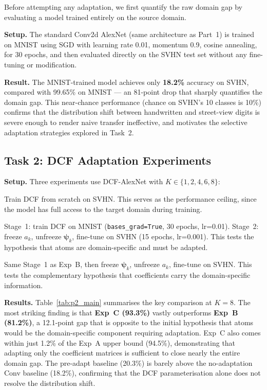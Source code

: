\documentclass[11pt,letterpaper]{article}
\newcommand{\psivec}{\boldsymbol{\psi}}
\begin{document}
Before attempting any adaptation, we first quantify the raw domain gap by
evaluating a model trained entirely on the source domain.

\textbf{Setup.}
The standard Conv2d AlexNet (same architecture as Part~1) is trained on
MNIST using SGD with learning rate 0.01, momentum 0.9, cosine annealing,
for 30 epochs, and then evaluated directly on the SVHN test set without
any fine-tuning or modification.

\textbf{Result.}
The MNIST-trained model achieves only \textbf{18.2\%} accuracy on SVHN,
compared with 99.65\% on MNIST --- an 81-point drop that sharply quantifies
the domain gap.  This near-chance performance (chance on SVHN's 10 classes
is 10\%) confirms that the distribution shift between handwritten and
street-view digits is severe enough to render naive transfer ineffective,
and motivates the selective adaptation strategies explored in Task~2.

\subsection{Task 2: DCF Adaptation Experiments}
\label{sec:p2_task2}

\textbf{Setup.}
Three experiments use DCF-AlexNet with $K \in \{1,2,4,6,8\}$:
\begin{description}[leftmargin=0pt]
  \item[Exp A (upper bound):] Train DCF from scratch on SVHN.
        This serves as the performance ceiling, since the model has full
        access to the target domain during training.
  \item[Exp B (adapt atoms):] Stage~1: train DCF on MNIST
        (\texttt{bases\_grad=True}, 30 epochs, lr=0.01).
        Stage~2: freeze $a_k$, unfreeze $\psivec_k$, fine-tune on SVHN
        (15 epochs, lr=0.001).
        This tests the hypothesis that atoms are domain-specific and must
        be adapted.
  \item[Exp C (adapt coefficients):] Same Stage~1 as Exp~B, then
        freeze $\psivec_k$, unfreeze $a_k$, fine-tune on SVHN.
        This tests the complementary hypothesis that coefficients carry the
        domain-specific information.
\end{description}

\textbf{Results.}
Table~\ref{tab:p2_main} summarises the key comparison at $K=8$.  The most
striking finding is that \textbf{Exp~C (93.3\%)} vastly outperforms
\textbf{Exp~B (81.2\%)}, a 12.1-point gap that is opposite to the initial
hypothesis that atoms would be the domain-specific component requiring
adaptation.  Exp~C also comes within just 1.2\% of the Exp~A upper bound
(94.5\%), demonstrating that adapting only the coefficient matrices is
sufficient to close nearly the entire domain gap.  The pre-adapt baseline
(20.3\%) is barely above the no-adaptation Conv baseline (18.2\%),
confirming that the DCF parameterisation alone does not resolve the
distribution shift.
\end{document}
